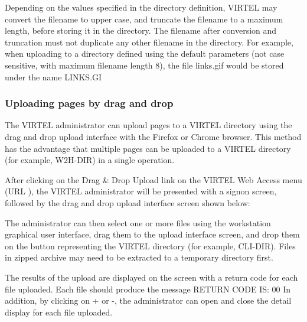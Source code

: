 \documentclass[letterpaper,10pt,english]{sphinxmanual}
\begin{document}


Depending on the values specified in the directory definition, VIRTEL may convert the filename to upper case, and truncate the filename to a maximum length, before storing it in the directory. The filename after conversion and truncation must not duplicate any other filename in the directory. For example, when uploading to a directory defined using the default parameters (not case sensitive, with maximum filename length 8), the file links.gif would be stored under the name LINKS.GI


\subsubsection{Uploading pages by drag and drop}
\label{\detokenize{User_Guide:uploading-pages-by-drag-and-drop}}
The VIRTEL administrator can upload pages to a VIRTEL directory using the drag and drop upload interface with the Firefox or Chrome browser. This method has the advantage that multiple pages can be uploaded to a VIRTEL directory (for example, W2H-DIR) in a single operation.


After clicking on the Drag \& Drop Upload link on the VIRTEL Web Access menu (URL ), the VIRTEL administrator will be presented with a signon screen, followed by the drag and drop upload interface screen shown below:



The administrator can then select one or more files using the workstation graphical user interface, drag them to the upload interface screen, and drop them on the button representing the VIRTEL directory (for example, CLI-DIR). Files in zipped archive may need to be extracted to a temporary directory first.




The results of the upload are displayed on the screen with a return code for each file uploaded. Each file should produce the message RETURN CODE IS: 00 In addition, by clicking on + or -, the administrator can open and close the detail display for each file uploaded.
\end{document}

